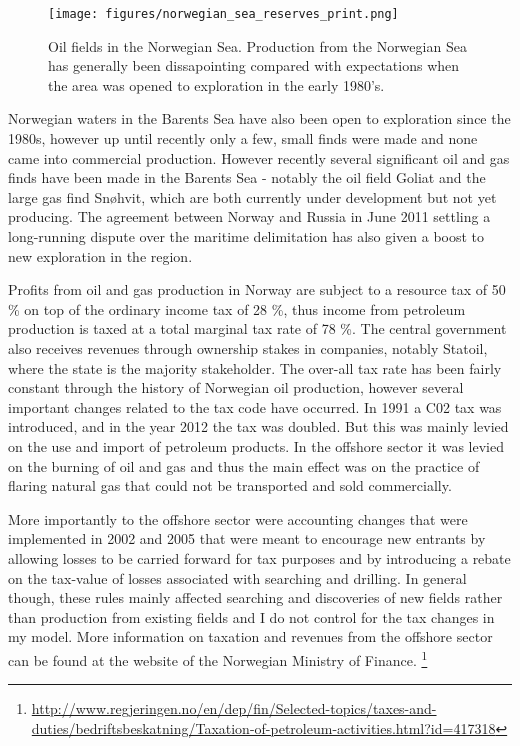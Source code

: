 \documentclass[11pt]{article}
\begin{document}
\begin{figure}
\texttt{[image: figures/norwegian\_sea\_reserves\_print.png]}
\caption{Oil fields in the Norwegian Sea.  Production from the Norwegian Sea has generally been dissapointing compared with expectations when the area was opened to exploration in the early 1980's.}
\label{norwegian_sea_reserves}
\end{figure}

Norwegian waters in the Barents Sea have also been open to exploration since the 1980s, however up until recently only a few, small finds were made and none came into commercial production.  However recently several significant oil and gas finds have been made in the Barents Sea - notably the oil field Goliat and the large gas find Sn\o hvit, which are both currently under development but not yet producing.  The agreement between Norway and Russia in June 2011 settling a long-running dispute over the maritime delimitation has also given a boost to new exploration in the region.  

Profits from oil and gas production in Norway are subject to a resource tax of 50 \% on top of the ordinary income tax of 28 \%, thus income from petroleum production is taxed at a total marginal tax rate of 78 \%.  The central government also receives revenues through ownership stakes in companies, notably Statoil, where the state is the majority stakeholder.  The over-all tax rate has been fairly constant through the history of Norwegian oil production, however several important changes related to the tax code have occurred.  In 1991 a C02 tax was introduced, and in the year 2012 the tax was doubled.  But this was mainly levied on the use and import of petroleum products.  In the offshore sector it was levied on the burning of oil and gas and thus the main effect was on the practice of flaring natural gas that could not be transported and sold commercially.   

More importantly to the offshore sector were accounting changes that were implemented in 2002 and 2005 that were meant to encourage new entrants by allowing losses to be carried forward for tax purposes and by introducing a rebate on the tax-value of losses associated with searching and drilling.  In general though, these rules mainly affected searching and discoveries of new fields rather than production from existing fields and I do not control for the tax changes in my model.  More information on taxation and revenues from the offshore sector can be found at the website of the Norwegian Ministry of Finance. \footnote{\url{http://www.regjeringen.no/en/dep/fin/Selected-topics/taxes-and-duties/bedriftsbeskatning/Taxation-of-petroleum-activities.html?id=417318}}
\end{document}
